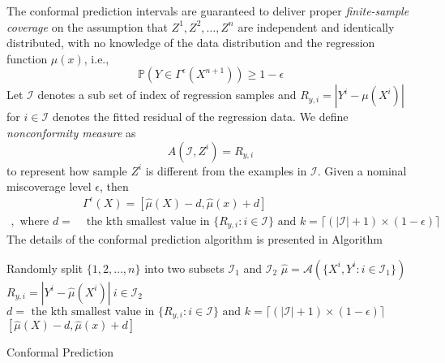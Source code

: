 \documentclass[10pt,onecolumn]{IEEEtran}
\begin{document}
The conformal prediction intervals are guaranteed to deliver proper \emph{finite-sample coverage} on the assumption that  $Z^1,Z^2,\ldots,Z^n$ are independent and identically distributed, with no knowledge of the data distribution and the regression function $\mu(x)$, i.e., 
\begin{equation}
  \mathbb P(Y\in \Gamma^{\epsilon}(X^{n+1}))\geq 1-\epsilon
\end{equation}
Let $\mathcal I$ denotes a sub set of index of regression samples and $R_{y,i}=|Y^i-\mu(X^i)|$ for $i\in \mathcal I$ denotes the fitted residual of the regression data. We define \emph{nonconformity measure} as $$A(\mathcal I,Z^i)=R_{y,i}$$  to represent how sample $Z^i$ is different from the examples in $\mathcal I$.  Given a nominal miscoverage level $\epsilon$, then 
\begin{align*}
&\Gamma^{\epsilon}(X)=\left[\hat \mu(X)-d,\hat \mu(x)+d\right]\\,\mbox{ where } d= &\mbox{ the kth smallest value in } \{R_{y,i}:i\in \mathcal I\}
\mbox{ and }k=\lceil  (|\mathcal I|+1)\times (1-\epsilon)  \rceil
\end{align*}
The details of the conformal prediction algorithm is presented in Algorithm~


\begin{algorithm}[H]
\DontPrintSemicolon
\SetAlgoLined
\BlankLine
Randomly split $\{1,2,\ldots,n\}$ into two subsets $\mathcal I_1$ and $\mathcal I_2$\;
$\hat \mu=\mathcal A(\{X^i,Y^i:i\in \mathcal I_1 \})$\;
$R_{y,i}=|Y^i-\hat \mu(X^i)|~i\in \mathcal I_2$\;
$d= \mbox{ the kth smallest value in } \{R_{y,i}:i\in \mathcal I\}
\mbox{ and }k=\lceil  (|\mathcal I|+1)\times (1-\epsilon)  \rceil$\;
\Return $\left[\hat \mu(X)-d,\hat \mu(x)+d\right]$
 
\caption{Conformal Prediction}
\end{algorithm}









\end{document}
